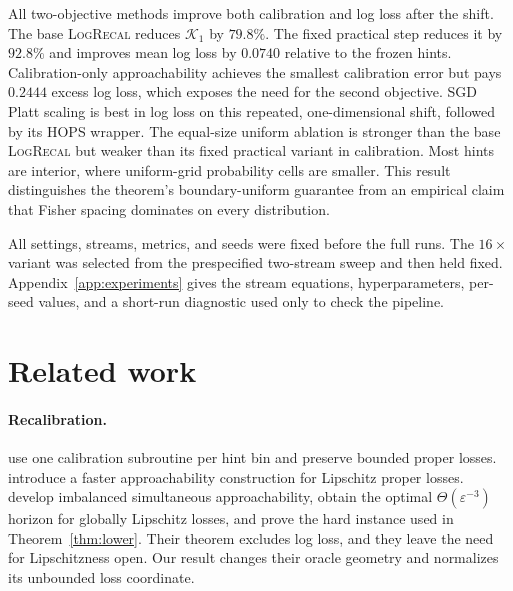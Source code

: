 \documentclass{article}
\newcommand{\method}{\textsc{LogRecal}\xspace}
\newcommand{\calK}{\mathcal{K}}
\begin{document}
All two-objective methods improve both calibration and log loss after the shift. The base \method reduces $\calK_1$ by $79.8\%$. The fixed practical step reduces it by $92.8\%$ and improves mean log loss by $0.0740$ relative to the frozen hints. Calibration-only approachability achieves the smallest calibration error but pays $0.2444$ excess log loss, which exposes the need for the second objective. SGD Platt scaling is best in log loss on this repeated, one-dimensional shift, followed by its HOPS wrapper. The equal-size uniform ablation is stronger than the base \method but weaker than its fixed practical variant in calibration. Most hints are interior, where uniform-grid probability cells are smaller. This result distinguishes the theorem's boundary-uniform guarantee from an empirical claim that Fisher spacing dominates on every distribution.

All settings, streams, metrics, and seeds were fixed before the full runs. The $16\times$ variant was selected from the prespecified two-stream sweep and then held fixed. Appendix~\ref{app:experiments} gives the stream equations, hyperparameters, per-seed values, and a short-run diagnostic used only to check the pipeline.

\section{Related work}
\label{sec:related}

\paragraph{Recalibration.}
\citet{kuleshov2017estimating} use one calibration subroutine per hint bin and preserve bounded proper losses. \citet{okoroafor2024faster} introduce a faster approachability construction for Lipschitz proper losses. \citet{hu2026optimal} develop imbalanced simultaneous approachability, obtain the optimal $\Theta(\varepsilon^{-3})$ horizon for globally Lipschitz losses, and prove the hard instance used in Theorem~\ref{thm:lower}. Their theorem excludes log loss, and they leave the need for Lipschitzness open. Our result changes their oracle geometry and normalizes its unbounded loss coordinate.
\end{document}
